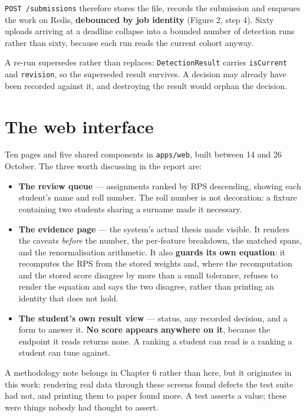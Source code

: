 \texttt{POST\ /submissions} therefore stores the file, records the
submission and enqueues the work on Redis, \textbf{debounced by job
identity} (Figure 2, step 4). Sixty uploads arriving at a deadline
collapse into a bounded number of detection runs rather than sixty,
because each run reads the current cohort anyway.

A re-run supersedes rather than replaces: \texttt{DetectionResult}
carries \texttt{isCurrent} and \texttt{revision}, so the superseded
result survives. A decision may already have been recorded against it,
and destroying the result would orphan the decision.

\hypertarget{the-web-interface}{%
\section{The web interface}\label{the-web-interface}}

Ten pages and five shared components in \texttt{apps/web}, built between
14 and 26 October. The three worth discussing in the report are:

\begin{itemize}
\tightlist
\item
  \textbf{The review queue} --- assignments ranked by RPS descending,
  showing each student's name and roll number. The roll number is not
  decoration: a fixture containing two students sharing a surname made
  it necessary.
\item
  \textbf{The evidence page} --- the system's actual thesis made
  visible. It renders the caveats \emph{before} the number, the
  per-feature breakdown, the matched spans, and the renormalisation
  arithmetic. It also \textbf{guards its own equation}: it recomputes
  the RPS from the stored weights and, where the recomputation and the
  stored score disagree by more than a small tolerance, refuses to
  render the equation and says the two disagree, rather than printing an
  identity that does not hold.
\item
  \textbf{The student's own result view} --- status, any recorded
  decision, and a form to answer it. \textbf{No score appears anywhere
  on it}, because the endpoint it reads returns none. A ranking a
  student can read is a ranking a student can tune against.
\end{itemize}

A methodology note belongs in Chapter 6 rather than here, but it
originates in this work: rendering real data through these screens found
defects the test suite had not, and printing them to paper found more. A
test asserts a value; these were things nobody had thought to assert.

